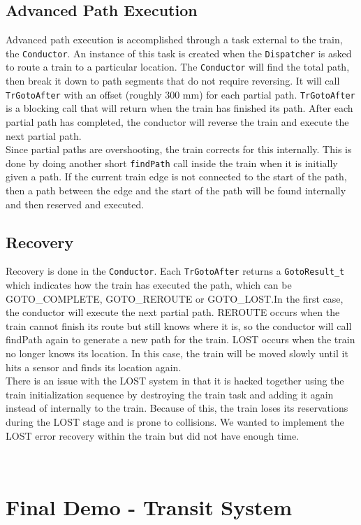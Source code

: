 \documentclass[12pt]{article}
\begin{document}
\subsection{Advanced Path Execution}
Advanced path execution is accomplished through a task external to the train, the \texttt{Conductor}. An instance of
this task is created when the \texttt{Dispatcher} is asked to route a train to a particular location. The
\texttt{Conductor} will find the total path, then break it down to path segments that do not require reversing. It will
call \texttt{TrGotoAfter} with an offset (roughly 300 mm) for each partial path. \texttt{TrGotoAfter} is a blocking call
that will return when the train has finished its path. After each partial path has completed, the conductor will reverse
the train and execute the next partial path.
\\
Since partial paths are overshooting, the train corrects for this internally. This is done by doing another short
\texttt{findPath} call inside the train when it is initially given a path. If the current train edge is not connected to
the start of the path, then a path between the edge and the start of the path will be found internally and then reserved
and executed.

\subsection{Recovery}
Recovery is done in the \texttt{Conductor}. Each \texttt{TrGotoAfter} returns a \texttt{GotoResult\_t} which indicates
how the train has executed the path, which can be GOTO\_COMPLETE, GOTO\_REROUTE or GOTO\_LOST.In the first case, the
conductor will execute the next partial path. REROUTE occurs when the train cannot finish its route but still knows
where it is, so the conductor will call findPath again to generate a new path for the train. LOST occurs when the train
no longer knows its location. In this case, the train will be moved slowly until it hits a sensor and finds its location
again.
\\
There is an issue with the LOST system in that it is hacked together using the train initialization sequence by destroying 
the train task and adding it again instead of internally to the train. Because of this, the train loses its reservations 
during the LOST stage and is prone to collisions. We wanted to implement the LOST error recovery within the train but did 
not have enough time.

\\[2\baselineskip]
\section{Final Demo - Transit System}
\end{document}
